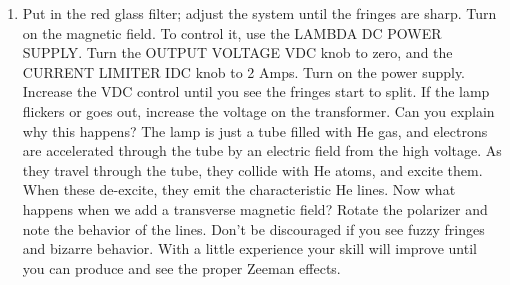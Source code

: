 \documentclass{../lab}
\begin{document}
\begin{enumerate}
    \item Put in the red glass filter; adjust the system until the fringes are sharp. Turn on the magnetic field. To control it, use the LAMBDA DC POWER SUPPLY. Turn the OUTPUT VOLTAGE VDC knob to zero, and the CURRENT LIMITER IDC knob to 2 Amps. Turn on the power supply. Increase the VDC control until you see the fringes start to split. If the lamp flickers or goes out, increase the voltage on the transformer. Can you explain why this happens? The lamp is just a tube filled with He gas, and electrons are accelerated through the tube by an electric field from the high voltage. As they travel through the tube, they collide with He atoms, and excite them. When these de-excite, they emit the characteristic He lines. Now what happens when we add a transverse magnetic field? Rotate the polarizer and note the behavior of the lines. Don't be discouraged if you see fuzzy fringes and bizarre behavior. With a little experience your skill will improve until you can produce and see the proper Zeeman effects.

    


\end{enumerate}
\end{document}
